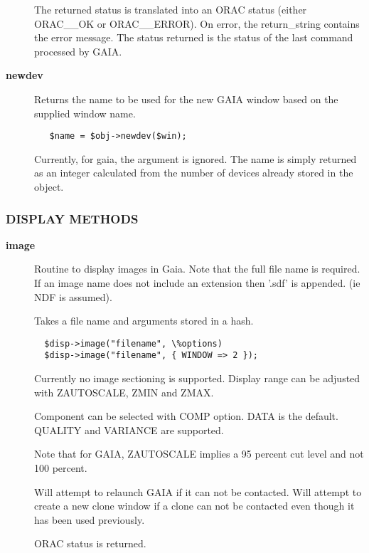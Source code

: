 \begin{description}
The returned status is translated into an ORAC status (either ORAC\_\_OK
or ORAC\_\_ERROR). On error, the return\_string contains the error message.
The status returned is the status of the last command processed by GAIA.


\item[{\textbf{newdev}}] \mbox{}

Returns the name to be used for the new GAIA window based on the supplied
window name.

\begin{verbatim}
   $name = $obj->newdev($win);
\end{verbatim}


Currently, for gaia, the argument is ignored. The name is simply returned
as an integer calculated from the number of devices already stored
in the object.

\end{description}
\subsubsection*{DISPLAY METHODS\label{ORAC::Display::GAIA_DISPLAY_METHODS}}
\begin{description}

\item[{\textbf{image}}] \mbox{}

Routine to display images in Gaia. Note that the full file name is required.
If an image name does not include an extension then '.sdf' is appended.
(ie NDF is assumed).



Takes a file name and arguments stored in a hash.

\begin{verbatim}
  $disp->image("filename", \%options)
  $disp->image("filename", { WINDOW => 2 });
\end{verbatim}


Currently no image sectioning is supported.
Display range can be adjusted with ZAUTOSCALE, ZMIN and ZMAX.



Component can be selected with COMP option. DATA is the default.
QUALITY and VARIANCE are supported.



Note that for GAIA, ZAUTOSCALE implies a 95 percent cut level and
not 100 percent.



Will attempt to relaunch GAIA if it can not be contacted.
Will attempt to create a new clone window if a clone can not be
contacted even though it has been used previously.



ORAC status is returned.

\end{description}
